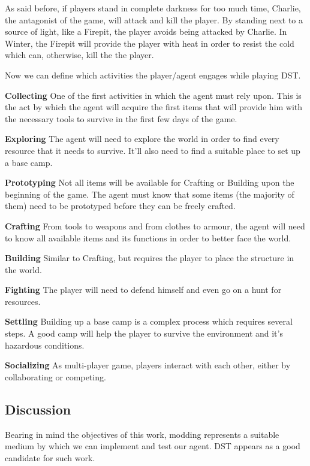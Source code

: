 As said before, if players stand in complete darkness for too much time, Charlie, the antagonist of the game, will attack and kill the player.
By standing next to a source of light, like a Firepit, the player avoids being attacked by Charlie.
In Winter, the Firepit will provide the player with heat in order to resist the cold which can, otherwise, kill the the player.

Now we can define which activities the player/agent engages while playing \ac{DST}.

\begin{description}
	\item \textbf{Collecting} One of the first activities in which the agent must rely upon.
This is the act by which the agent will acquire the first items that will provide him with the necessary tools to survive in the first few days of the game.
	\item \textbf{Exploring} The agent will need to explore the world in order to find every resource that it needs to survive.
	It'll also need to find a suitable place to set up a base camp.
	\item \textbf{Prototyping} Not all items will be available for Crafting or Building upon the beginning of the game.
	The agent must know that some items (the majority of them) need to be prototyped before they can be freely crafted.
	\item \textbf{Crafting} From tools to weapons and from clothes to armour, the agent will need to know all available items and its functions in order to better face the world.
	\item \textbf{Building} Similar to Crafting, but requires the player to place the structure in the world.
	\item \textbf{Fighting} The player will need to defend himself and even go on a hunt for resources.
	\item \textbf{Settling} Building up a base camp is a complex process which requires several steps.
	A good camp will help the player to survive the environment and it's hazardous conditions.
	\item \textbf{Socializing} As multi-player game, players interact with each other, either by collaborating or competing.
\end{description}

\subsection{Discussion}

Bearing in mind the objectives of this work, modding represents a suitable medium by which we can implement and test our agent.
\ac{DST} appears as a good candidate for such work.